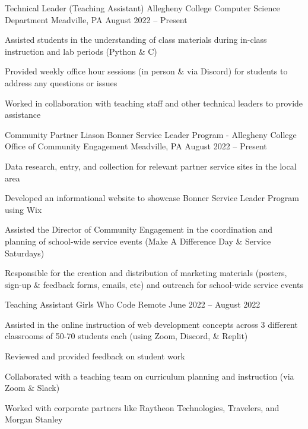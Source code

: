 

\begin{cventries}
    \cventry
    {Technical Leader (Teaching Assistant)}
    {Allegheny College Computer Science Department}
    {Meadville, PA}
    {August 2022 – Present}
        {\begin{cvitems}
		\item {Assisted students in the understanding of class materials during in-class instruction and lab periods (Python \& C)}
		\item {Provided weekly office hour sessions (in person \& via Discord) for students to address any questions or issues}
		\item {Worked in collaboration with teaching staff and other technical leaders to provide assistance}
	\end{cvitems}}
 
    \cventry
    {Community Partner Liason}
    {Bonner Service Leader Program - Allegheny College Office of Community Engagement}
    {Meadville, PA}
    {August 2022 – Present}
	{\begin{cvitems}
		\item {Data research, entry, and collection for relevant partner service sites in the local area}
		\item {Developed an informational website to showcase Bonner Service Leader Program using Wix}
		\item {Assisted the Director of Community Engagement in the coordination and planning of school-wide service events (Make A Difference Day \& Service Saturdays)}
		\item {Responsible for the creation and distribution of marketing materials (posters, sign-up \& feedback forms, emails, etc) and outreach for school-wide service events}
	\end{cvitems}}
 
    \cventry
    {Teaching Assistant}
    {Girls Who Code}
    {Remote}
    {June 2022 – August 2022}
	{\begin{cvitems}
		\item {Assisted in the online instruction of web development concepts across 3 different classrooms of 50-70 students each (using Zoom, Discord, \& Replit)}
		\item {Reviewed and provided feedback on student work}
		\item {Collaborated with a teaching team on curriculum planning and instruction (via Zoom \& Slack)}
		\item {Worked with corporate partners like Raytheon Technologies, Travelers, and Morgan Stanley}
	\end{cvitems}}
 

\end{cventries}

